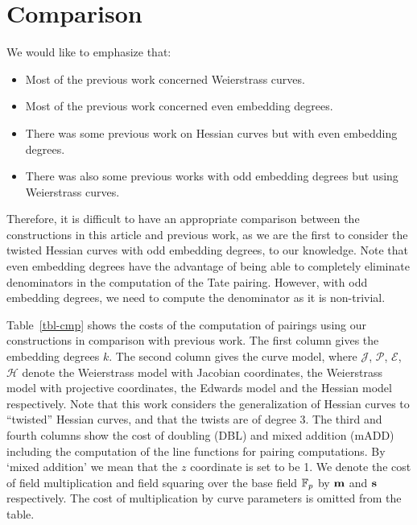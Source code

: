 \section{Comparison}
\label{sec:cmp}

We would like to emphasize that:
\begin{itemize}
\item	Most of the previous work concerned Weierstrass curves.
\item	Most of the previous work concerned even embedding degrees.
\item	There was some previous work on Hessian curves but with even embedding degrees.
\item	There was also some previous works with odd embedding degrees but using Weierstrass curves.
\end{itemize}
Therefore, it is difficult to have an appropriate comparison between the constructions in this article and previous work, as we are the first to consider the twisted Hessian curves with odd embedding degrees, to our knowledge.
Note that even embedding degrees have the advantage of being able to completely eliminate denominators in the computation of the Tate pairing. However, with odd embedding degrees, we need to compute the denominator as it is non-trivial.

Table~\ref{tbl-cmp} shows the costs of the computation of pairings using our constructions in comparison with previous work. The first column gives the embedding degrees $k$.
The second column gives the curve model, where 
$\mathcal{J}$, $\mathcal{P}$, $\mathcal{E}$, $\mathcal{H}$ denote the
Weierstrass model with Jacobian coordinates, the
Weierstrass model with projective coordinates,
the Edwards model and the
Hessian model respectively.
Note that this work considers the generalization of Hessian curves to ``twisted'' Hessian curves, and that the twists are of degree 3.
The third and fourth columns show the cost of doubling (DBL) and mixed addition (mADD) including the computation of the line functions for pairing computations.
By `mixed addition' we mean that the $z$ coordinate is set to be 1.
We denote the cost of field multiplication and field squaring over the base field $\mathbb{F}_{p}$ by $\textbf{m}$ and $\textbf{s}$ respectively.
The cost of multiplication by curve parameters is omitted from the table.

